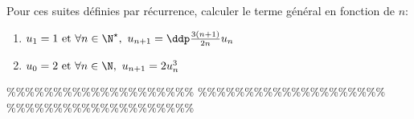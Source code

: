 



\begin{exercice} \;
Pour ces suites d\'efinies par r\'ecurrence, calculer le terme g\'en\'eral en fonction de $n$:
\begin{enumerate}
\item 
$u_1=1\ \hbox{et}\ \forall n\in\N^{\star},\ u_{n+1}=\ddp\frac{3(n+1)}{2n}u_n$
\item 
$u_0=2\ \hbox{et}\ \forall n\in\N,\ u_{n+1}=2u_n^3$
\end{enumerate}
\end{exercice}


\%\%\%\%\%\%\%\%\%\%\%\%\%\%\%\%\%\%\%\%
\%\%\%\%\%\%\%\%\%\%\%\%\%\%\%\%\%\%\%\%
\%\%\%\%\%\%\%\%\%\%\%\%\%\%\%\%\%\%\%\%



